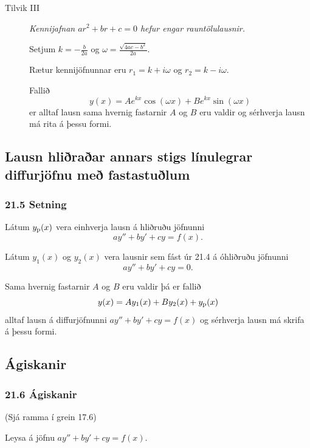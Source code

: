  \subsubsection{
}
\begin{description}
\item[Tilvik III] \emph{Kennijafnan $ar^2+br+c=0$ hefur engar rauntölulausnir.}

\pause

Setjum $k=-\frac{b}{2a}$ og $\omega=\frac{\sqrt{4ac-b^2}}{2a}$. \pause

Rætur kennijöfnunnar eru $r_1=k+i\omega$ og $r_2=k-i\omega$.
\pause

Fallið
$$y(x)=Ae^{kx}\cos(\omega x)+Be^{kx}\sin(\omega x)$$
er alltaf lausn sama hvernig fastarnir $A$ og $B$ eru valdir \pause og
sérhverja lausn má rita á þessu formi.
\end{description}
 


\subsection[t]{Lausn hliðraðar annars stigs línulegrar diffurjöfnu með
  fastastuðlum}
 \subsubsection{21.5 Setning}
Látum $y_{\rm p}(x)$ vera einhverja lausn á hliðruðu jöfnunni
  $$
ay''+by'+cy=f(x).
$$ 
\pause

Látum $y_1(x)$ og $y_2(x)$ vera lausnir sem fást úr 21.4 á
  óhliðruðu jöfnunni
$$
ay''+by'+cy=0.
$$

\pause

Sama hvernig fastarnir $A$ og
  $B$ eru valdir þá er fallið 
$$y(x)=Ay_1(x)+By_2(x)+y_{\rm p}(x)$$ \pause
alltaf lausn á diffurjöfnunni  $ay''+by'+cy=f(x)$ og sérhverja lausn
má skrifa á þessu formi.
 


\subsection[t]{Ágiskanir}
 \subsubsection{21.6 Ágiskanir} (Sjá ramma í grein 17.6)

Leysa á jöfnu $ay''+by'+cy=f(x)$.

\pause

